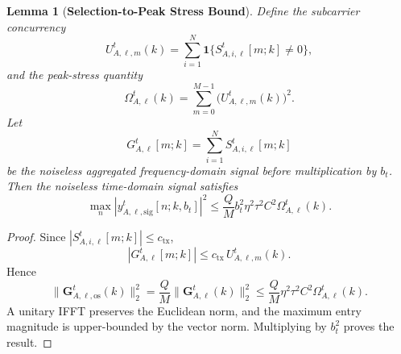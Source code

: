 \documentclass[journal]{IEEEtran}
\newtheorem{lemma}{Lemma}
\begin{document}
\begin{lemma}[\bf Selection-to-Peak Stress Bound]
    \label{lemma:peak_stress}
    Define the subcarrier concurrency
    \begin{equation}
        U_{A,\ell,m}^t(k)=\sum_{i=1}^{N}\mathbf{1}\{S_{A,i,\ell}^t[m;k]\neq0\},
    \end{equation}
    and the peak-stress quantity
    \begin{equation}
        \Omega_{A,\ell}^t(k)=\sum_{m=0}^{M-1}\big(U_{A,\ell,m}^t(k)\big)^2.
    \end{equation}
    Let
    \begin{equation}
        G_{A,\ell}^t[m;k]=\sum_{i=1}^{N}S_{A,i,\ell}^t[m;k]
    \end{equation}
    be the noiseless aggregated frequency-domain signal before multiplication by $b_t$. Then the noiseless time-domain signal satisfies
    \begin{equation}
        \max_n\left|y_{A,\ell,\mathrm{sig}}^t[n;k,b_t]\right|^2
        \le
        \frac{Q}{M}b_t^2\eta^2\tau^2C^2\Omega_{A,\ell}^t(k).
    \end{equation}
\end{lemma}
\begin{proof}
    Since $|S_{A,i,\ell}^t[m;k]|\le c_{\mathrm{tx}}$,
    \begin{equation}
        |G_{A,\ell}^t[m;k]|\le c_{\mathrm{tx}}\,U_{A,\ell,m}^t(k).
    \end{equation}
    Hence
    \begin{equation}
        \|\mathbf{G}_{A,\ell,\mathrm{os}}^t(k)\|_2^2
        =\frac{Q}{M}\|\mathbf{G}_{A,\ell}^t(k)\|_2^2
        \le \frac{Q}{M}\eta^2\tau^2C^2\Omega_{A,\ell}^t(k).
    \end{equation}
    A unitary IFFT preserves the Euclidean norm, and the maximum entry magnitude is upper-bounded by the vector norm. Multiplying by $b_t^2$ proves the result.
\end{proof}
\end{document}
